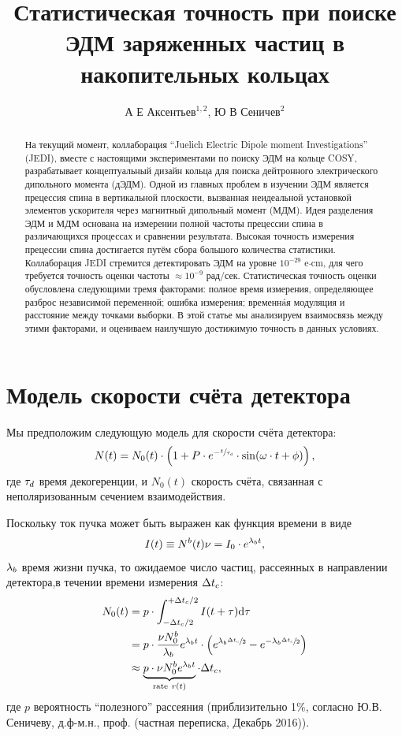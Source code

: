\documentclass{jpconf}
\begin{document}
\title{Статистическая точность при поиске ЭДМ заряженных частиц в накопительных кольцах}
\author{А Е Аксентьев$^{1,2}$, Ю В Сеничев$^2$}
\address{ $^1$ IKP, Forschungszentrum J\"ulich, J\"ulich, Германия}
\address{$^2$ Национальный Исследовательский Ядерный Университет ``МИФИ,'' Москва, Россия}


\begin{abstract}
	На текущий момент, коллаборация “Juelich Electric Dipole moment Investigations” (JEDI), вместе с настоящими экспериментами по поиску ЭДМ на кольце COSY, разрабатывает концептуальный дизайн кольца для поиска дейтронного электрического дипольного момента (дЭДМ). Одной из главных проблем в изучении ЭДМ является прецессия спина в вертикальной плоскости, вызванная неидеальной установкой элементов ускорителя через магнитный дипольный момент (МДМ). Идея разделения ЭДМ и МДМ основана на измерении полной частоты прецессии спина в различающихся процессах и сравнении результата. Высокая точность измерения прецессии спина достигается путём сбора большого количества статистики. Коллаборация JEDI стремится детектировать ЭДМ на уровне $10^{-29}$ e$\cdot$cm, для чего требуется точность оценки частоты $\approx 10^{-9}$ рад/сек. Статистическая точность оценки обусловлена следующими тремя факторами: полное время измерения, определяющее разброс независимой переменной; ошибка измерения; временн\'{a}я модуляция и расстояние между точками выборки. В этой статье мы анализируем взаимосвязь между этими факторами, и оцениваем наилучшую достижимую точность в данных условиях.
\end{abstract}

\section{Модель скорости счёта детектора}
Мы предположим следующую модель для скорости счёта детектора:
\begin{equation}\label{eq:DetCntRt}
	N(t) = N_0(t)\cdot\bkt{1 + P\cdot e^{-\sfrac{t}{\LTd}}\cdot\sin(\omega\cdot t + \phi)},
\end{equation}
где $\tau_d$ время декогеренции, и $N_0(t)$ скорость счёта, связанная с неполяризованным сечением взаимодействия.

Поскольку ток пучка может быть выражен как функция времени в виде 
\[
	I(t) \equiv N^b(t)\nu = I_0\cdot e^{\lambda_b t},
\]
$\lambda_b$ время жизни пучка, то ожидаемое число частиц, рассеянных в направлении детектора,в течении времени измерения $\Delta t_{c}$:
\begin{align}
N_0(t) & = p\cdot\int_{-\dtc/2}^{+\dtc/2} I(t+\tau)\td\tau \notag                    \\
& = p\cdot\frac{\nu N_0^b}{\lamb} e^{\lamb t}\cdot \bkt{e^{\lamb\sfrac{\dtc}{2}} - e^{-\lamb\sfrac{\dtc}{2}}} \notag \\
& \approx \underbrace{p\cdot\nu N_0^b e^{\lamb t}}_{\text{rate}~r(t)} \cdot\dtc,
\end{align}
где $p$ вероятность ``полезного'' рассеяния (приблизительно 1\%, согласно Ю.В. Сеничеву, д.ф-м.н., проф. (частная переписка, Декабрь 2016)).
\end{document}
